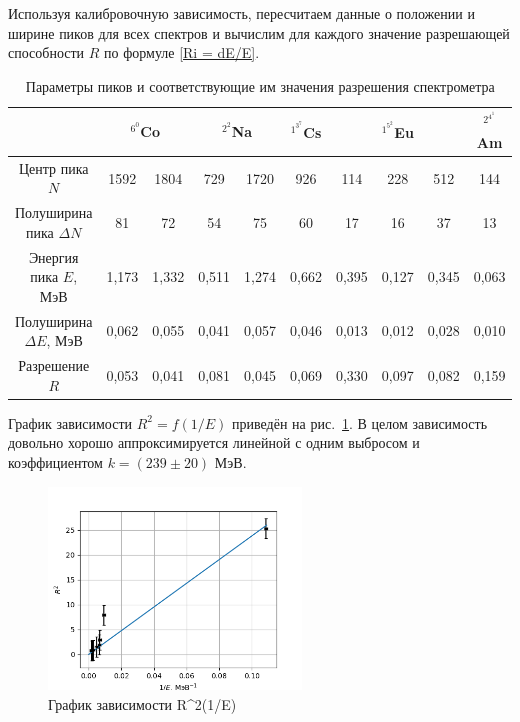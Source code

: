 \documentclass[a4paper,12pt]{article} %
\begin{document}
Используя калибровочную зависимость, пересчитаем данные о положении и ширине пиков для всех спектров и вычислим для каждого значение разрешающей способности $R$ по формуле \eqref{Ri = dE/E}.
\begin{table}[h]
    \centering
    \begin{tabular}{|c|c|c|c|c|c|c|c|c|c|} \hline
         & \multicolumn{2}{|c|}{$^6^0$Co} & \multicolumn{2}{c|}{$^2^2$Na} & $^1^3^7$Cs & \multicolumn{3}{c|}{$^1^5^2$Eu} & $^2^4^1$Am \\ \hline
        Центр пика $N$ & 1592 & 1804 & 729 & 1720 & 926 & 114 & 228 & 512 & 144 \\ \hline
        Полуширина пика $\Delta N$ & 81 & 72 & 54 & 75 & 60 & 17 & 16 & 37 & 13 \\ \hline
        Энергия пика $E$, МэВ & 1,173 & 1,332 & 0,511 & 1,274 & 0,662 & 0,395 & 0,127 & 0,345 & 0,063 \\ \hline
        Полуширина $\Delta E$, МэВ & 0,062 & 0,055 & 0,041 & 0,057 & 0,046 & 0,013 & 0,012 & 0,028 & 0,010 \\ \hline
        Разрешение $R$ & 0,053 & 0,041 & 0,081 & 0,045 & 0,069 & 0,330 & 0,097 & 0,082 & 0,159 \\ \hline
    \end{tabular}
    \caption{Параметры пиков и соответствующие им значения разрешения спектрометра}
    \label{tab:peak_resolution}
\end{table}

График зависимости $R^2 = f(1/E)$ приведён на рис.~\ref{fig:Rsquare}. В целом зависимость довольно хорошо аппроксимируется линейной с одним выбросом и коэффициентом $k = (239 \pm 20)$ МэВ.

\begin{figure}[h]
    \centering
    \includegraphics[width=0.6\textwidth]{graph2.png}
    \caption{График зависимости R^2(1/E)}
    \label{fig:Rsquare}
\end{figure}
\end{document}
